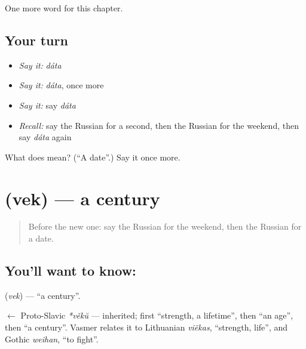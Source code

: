 \begin{grammarlens}[title={What you've built}]
One more word for this chapter.
\end{grammarlens}

\subsection*{Your turn}
\begin{itemize}
\raggedright
  \item \emph{Say it:} \emph{dáta}
  \item \emph{Say it:} \emph{dáta}, once more
  \item \emph{Say it:} say \emph{dáta}
  \item \emph{Recall:} say the Russian for a second, then the Russian for the weekend, then say \emph{dáta} again
\end{itemize}

\begin{tcolorbox}[breakable,colback=teal!4,colframe=teal!35!black,title={Before you move on}]
What does  mean? (\textquotedblleft{}A date\textquotedblright{}.) Say it once more.
\end{tcolorbox}
\section[\texorpdfstring{\ru{век} (vek)}{век (vek)}]{ (vek) — a century}

\label{lesson:RU-C85-century}



\begin{quote}
Before the new one: say the Russian for the weekend, then the Russian for a date.
\end{quote}

\subsection*{You'll want to know: }
\textbf{} (\emph{vek}) — \textquotedblleft{}a century\textquotedblright{}.

\begin{cousinweb}
\textbf{} $\leftarrow$ Proto-Slavic \emph{*věkŭ} — inherited; first \textquotedblleft{}strength, a lifetime\textquotedblright{}, then \textquotedblleft{}an age\textquotedblright{}, then \textquotedblleft{}a century\textquotedblright{}. Vasmer relates it to Lithuanian \emph{viẽkas}, \textquotedblleft{}strength, life\textquotedblright{}, and Gothic \emph{weihan}, \textquotedblleft{}to fight\textquotedblright{}.
\end{cousinweb}

